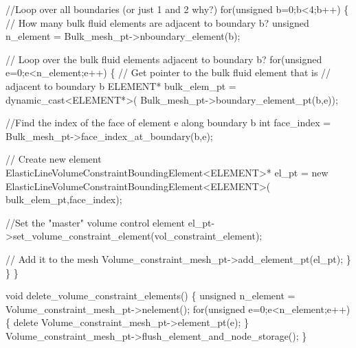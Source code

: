 \begin{DoxyCodeInclude}
   \textcolor{comment}{//Loop over all boundaries (or just 1 and 2 why?)}
   \textcolor{keywordflow}{for}(\textcolor{keywordtype}{unsigned} b=0;b<4;b++)
    \{
     \textcolor{comment}{// How many bulk fluid elements are adjacent to boundary b?}
     \textcolor{keywordtype}{unsigned} n\_element = Bulk\_mesh\_pt->nboundary\_element(b);
     
     \textcolor{comment}{// Loop over the bulk fluid elements adjacent to boundary b?}
     \textcolor{keywordflow}{for}(\textcolor{keywordtype}{unsigned} e=0;e<n\_element;e++)
      \{
       \textcolor{comment}{// Get pointer to the bulk fluid element that is }
       \textcolor{comment}{// adjacent to boundary b}
       ELEMENT* bulk\_elem\_pt = \textcolor{keyword}{dynamic\_cast<}ELEMENT*\textcolor{keyword}{>}(
        Bulk\_mesh\_pt->boundary\_element\_pt(b,e));
       
       \textcolor{comment}{//Find the index of the face of element e along boundary b}
       \textcolor{keywordtype}{int} face\_index = Bulk\_mesh\_pt->face\_index\_at\_boundary(b,e);
       
       \textcolor{comment}{// Create new element}
       ElasticLineVolumeConstraintBoundingElement<ELEMENT>* el\_pt =
        \textcolor{keyword}{new} ElasticLineVolumeConstraintBoundingElement<ELEMENT>(
         bulk\_elem\_pt,face\_index);   
       
       \textcolor{comment}{//Set the "master" volume control element}
       el\_pt->set\_volume\_constraint\_element(vol\_constraint\_element);
       
       \textcolor{comment}{// Add it to the mesh}
       Volume\_constraint\_mesh\_pt->add\_element\_pt(el\_pt);     
      \}
    \}
  \}

 \textcolor{keywordtype}{void} delete\_volume\_constraint\_elements()
  \{
   \textcolor{keywordtype}{unsigned} n\_element = Volume\_constraint\_mesh\_pt->nelement();
   \textcolor{keywordflow}{for}(\textcolor{keywordtype}{unsigned} e=0;e<n\_element;e++)
    \{
     \textcolor{keyword}{delete} Volume\_constraint\_mesh\_pt->element\_pt(e);
    \}
   Volume\_constraint\_mesh\_pt->flush\_element\_and\_node\_storage();
  \}
 

\end{DoxyCodeInclude}
